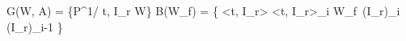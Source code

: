 G(W, A) = \{P^{1/\gamma} \cdot {} \vert t, I_r \in W\}
B(W_f) = \{ <t, I_r> \vert <t, I_r>_i \in W_f\ (I_r)_i \neq (I_r)_{i-1} \}